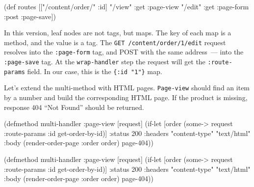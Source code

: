 \else

\begin{english}
  \begin{clojure}
(def routes
  [["/content/order/" :id] {"/view" {:get  :page-view}
                            "/edit" {:get  :page-form
                                     :post :page-save}}])
  \end{clojure}
\end{english}

\fi

In this version, leaf nodes are not tags, but maps. The key of each map is a method, and the value is a tag. The \verb|GET /content/order/1/edit| request resolves into
the \verb|:page-form| tag, and POST with the same address~--- into the \verb|:page-save| tag.  At the \verb|wrap-handler| step the request will get the \verb|:route-params| field. In our case, this is the \verb|{:id "1"}| map.


Let's extend the multi-method with HTML pages. \verb|Page-view| should find an item by a number and build the corresponding HTML page. If the product is missing, response 404 ``Not Found'' should be returned.

\ifx\DEVICETYPE\MOBILE

\begin{english}
  \begin{clojure}
(defmethod multi-handler :page-view
  [request]
  (if-let [order (some->
                   request
                   :route-params
                   :id
                   get-order-by-id)]
    {:status 200
     :headers {"content-type"
               "text/html"}
     :body (render-order-page
             {:order order})}
    page-404))
  \end{clojure}
\end{english}

\else

\begin{english}
  \begin{clojure}
(defmethod multi-handler :page-view
  [request]
  (if-let [order (some-> request
                         :route-params
                         :id
                         get-order-by-id)]
    {:status 200
     :headers {"content-type" "text/html"}
     :body (render-order-page {:order order})}
    page-404))
  \end{clojure}
\end{english}

\fi

